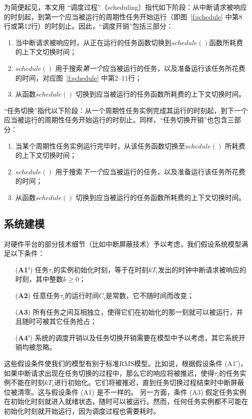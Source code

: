为简便起见，本文用
“调度过程”（scheduling）指代如下阶段：从中断请求被响应的时刻起，到第一个应当被运行的周期性任务开始运行（即图~\ref{f:schedule} 中第8行或第12行）的时刻止。因此，“调度开销”包括三部分：
\begin{enumerate}
\item 当中断请求被响应时，从正在运行的任务函数切换到$\mathit{schedule()}$函数所耗费的上下文切换时间；
\item $\mathit{schedule()}$ 用于搜索\emph{第一个}应当被运行的任务，以及准备运行该任务所花费的时间，对应图~\ref{f:schedule} 中第2--11行；
\item 从函数$\mathit{schedule()}$ 切换到应当被运行的任务函数所耗费的上下文切换时间。
\end{enumerate}
“任务切换”指代以下阶段：从一个周期性任务实例完成其运行的时刻起，到下一个应当被运行的周期性任务开始运行的时刻止。同样，“任务切换开销”也包含三部分：
\begin{enumerate}
\item 当某个周期性任务实例运行完毕时，从该任务函数切换至$\mathit{schedule()}$ 所耗费的上下文切换时间；
\item $\mathit{schedule()}$ 用于搜索\emph{下一个}应当被运行的任务，以及准备运行该任务所花费的时间；
\item 从函数$\mathit{schedule()}$ 切换到应当被运行的任务函数所耗费的上下文切换时间。
\end{enumerate}


\subsection{系统建模}
\label{s:formalism}

对硬件平台的部分技术细节（比如中断屏蔽技术）予以考虑，我们假设系统模型满足以下条件：
\begin{enumerate}
\item[(\textbf{A1'})] 
    任务$\tau_i$的实例初始化时刻，等于在时刻$kT_i$发出的时钟中断请求被响应的时刻，其中整数$k\ge 0$；
\item[(\textbf{A2})] 
    任意任务$\tau_i$的运行时间$C_i$是常数，它不随时间而改变；
\item[(\textbf{A3})]
    所有任务之间互相独立，使得它们在初始化的那一刻就可以被运行，并且随时可被其它任务抢占；
\item[(\textbf{A4'})] 
    系统的调度开销以及任务切换开销需要在模型中予以考虑，其它系统开销均被忽略。
\end{enumerate}

这些假设条件使我们的模型有别于标准RMS模型。比如说，根据假设条件 (A1')，如果中断请求出现在任务切换的过程中，那么它的响应将被推迟，使得$\tau_i$的任务实例不能在时刻$kT_i$进行初始化。它们将被推迟，直到任务切换过程结束时中断屏蔽位被清零。这与假设条件 (A1) 是不一样的。
另一方面，条件 (A3) 假定任务实例在初始化时刻就进入就绪状态，随时可以被运行。然而，任何任务实例都不可能在初始化时刻就开始运行，因为调度过程也需要耗时。

